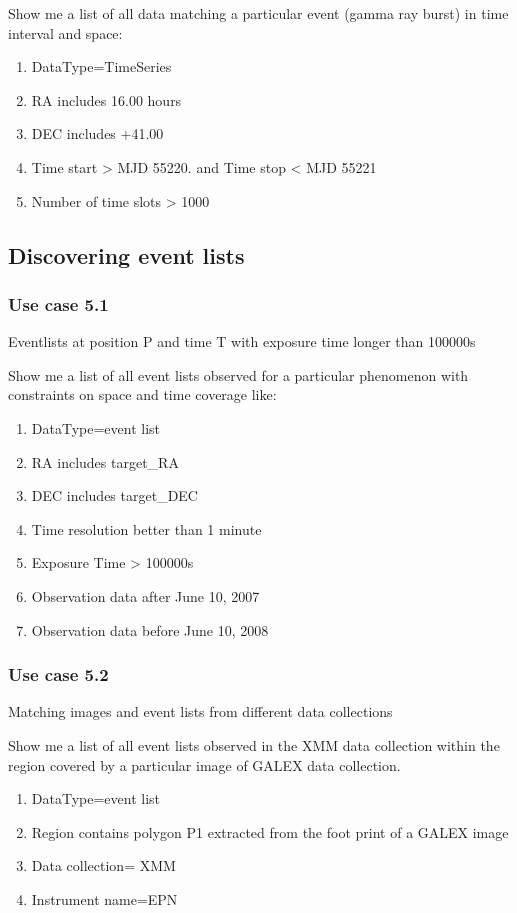 \documentclass[11pt,a4paper]{ivoa}
\begin{document}
Show me a list of all data matching a particular event (gamma ray burst) in time interval and space:

\begin{enumerate}
\item DataType=TimeSeries
\item RA includes 16.00 hours
\item DEC includes +41.00
\item Time start {\textgreater} MJD 55220. and Time stop {\textless} MJD 55221
\item Number of time slots {\textgreater} 1000
\end{enumerate}
\subsection{Discovering event lists}
\subsubsection{Use case 5.1}
Eventlists at position P and time T with exposure time longer than 100000s

Show me a list of all event lists observed for a particular phenomenon with constraints on space and time coverage like:

\begin{enumerate}
\item DataType=event list
\item RA includes target\_RA
\item DEC includes target\_DEC
\item Time resolution better than 1 minute
\item Exposure Time {\textgreater} 100000s
\item Observation data after June 10, 2007
\item Observation data before June 10, 2008
\end{enumerate}

\subsubsection{Use case 5.2}
Matching images and event lists from different data collections

Show me a list of all event lists observed in the XMM data collection within the region covered by a particular image of
GALEX data collection.

\begin{enumerate}
\item DataType=event list
\item Region contains polygon P1 extracted from the foot print of a GALEX image
\item Data collection= XMM
\item Instrument name=EPN
\end{enumerate}
\end{document}
